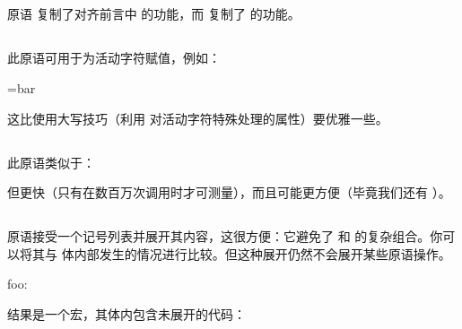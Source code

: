 \subsection{}

原语  复制了对齐前言中 \type {#} 的功能，而  复制了 \type {&} 的功能。

\subsection{}

此原语可用于为活动字符赋值，例如：

\begin{typing}
\def\foo{bar} =\foo
\end{typing}

这比使用大写技巧（利用  对活动字符特殊处理的属性）要优雅一些。

\subsection{}

此原语类似于：

\begin{typing}
\def\glet{\global\let}
\end{typing}

但更快（只有在数百万次调用时才可测量），而且可能更方便（毕竟我们还有 \type {\gdef}）。

\subsection{}


 原语接受一个记号列表并展开其内容，这很方便：它避免了  和  的复杂组合。你可以将其与  体内部发生的情况进行比较。但这种展开仍然不会展开某些原语操作。

\begin{typing}
\newcount\NumberOfCalls

\def\TestMe{\advance\NumberOfCalls1 }

\edef\Tested{\TestMe foo:\the\NumberOfCalls}
\edef\Tested{\TestMe foo:\the\NumberOfCalls}
\edef\Tested{\TestMe foo:\the\NumberOfCalls}

\meaning\Tested
\end{typing}

结果是一个宏，其体内包含未展开的代码：

